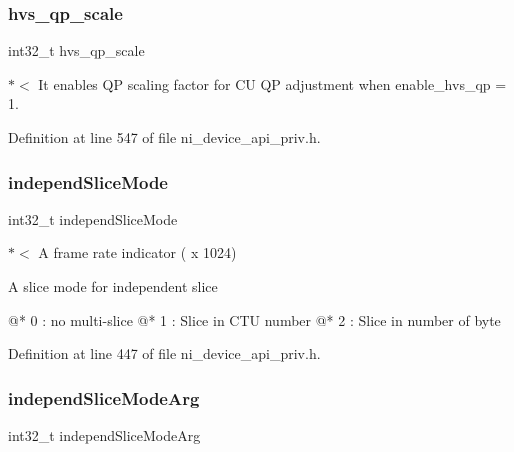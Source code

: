 \subsubsection{\texorpdfstring{hvs\_qp\_scale}{hvs\_qp\_scale}}
{\footnotesize\ttfamily int32\+\_\+t hvs\+\_\+qp\+\_\+scale}

$\ast$$<$ It enables QP scaling factor for CU QP adjustment when enable\+\_\+hvs\+\_\+qp = 1. 

Definition at line 547 of file ni\+\_\+device\+\_\+api\+\_\+priv.\+h.

\mbox{\label{struct__ni__encoder__change__params__t_a30a01a8c46d70e118ff75abc8b5e3014}} 
\subsubsection{\texorpdfstring{independSliceMode}{independSliceMode}}
{\footnotesize\ttfamily int32\+\_\+t independ\+Slice\+Mode}

$\ast$$<$ A frame rate indicator ( x 1024)


\begin{DoxyItemize}
\item \begin{DoxyVerb}A slice mode for independent slice

@* 0 : no multi-slice
@* 1 : Slice in CTU number
@* 2 : Slice in number of byte
\end{DoxyVerb}
 
\end{DoxyItemize}

Definition at line 447 of file ni\+\_\+device\+\_\+api\+\_\+priv.\+h.

\mbox{\label{struct__ni__encoder__change__params__t_a5410e44e3af2b66682101df91d419bc0}} 
\subsubsection{\texorpdfstring{independSliceModeArg}{independSliceModeArg}}
{\footnotesize\ttfamily int32\+\_\+t independ\+Slice\+Mode\+Arg}



